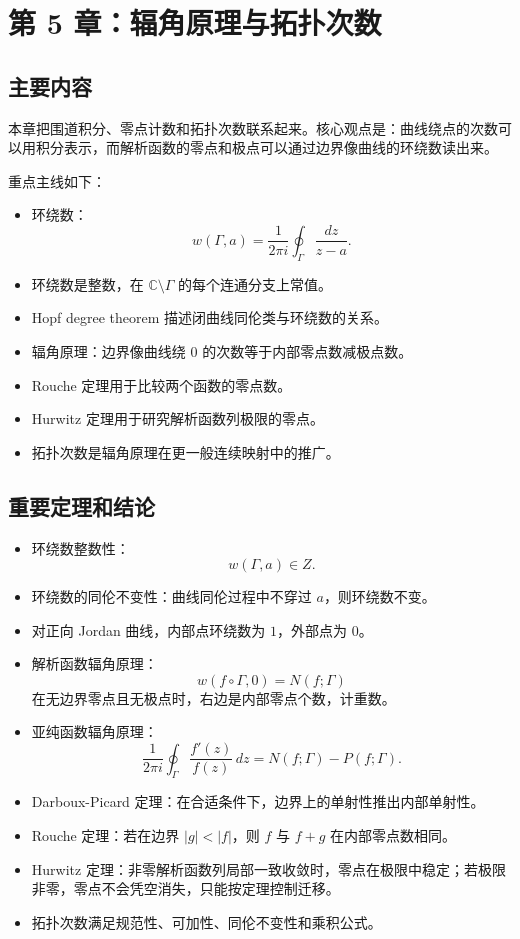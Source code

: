 \documentclass{article}
\begin{document}
\section{第 5 章：辐角原理与拓扑次数}

\subsection{主要内容}

本章把围道积分、零点计数和拓扑次数联系起来。核心观点是：曲线绕点的次数可以用积分表示，而解析函数的零点和极点可以通过边界像曲线的环绕数读出来。

重点主线如下：

\begin{itemize}
\item
  环绕数： \[
  w(\Gamma,a)=\frac{1}{2\pi i}\oint_\Gamma\frac{dz}{z-a}.
  \]
\item
  环绕数是整数，在 \(\mathbb C\setminus\Gamma\)
  的每个连通分支上常值。
\item
  Hopf degree theorem 描述闭曲线同伦类与环绕数的关系。
\item
  辐角原理：边界像曲线绕 $0$ 的次数等于内部零点数减极点数。
\item
  Rouche 定理用于比较两个函数的零点数。
\item
  Hurwitz 定理用于研究解析函数列极限的零点。
\item
  拓扑次数是辐角原理在更一般连续映射中的推广。
\end{itemize}

\subsection{重要定理和结论}

\begin{itemize}
\item
  环绕数整数性： \[
  w(\Gamma,a)\in Z.
  \]
\item
  环绕数的同伦不变性：曲线同伦过程中不穿过 $a$，则环绕数不变。
\item
  对正向 Jordan 曲线，内部点环绕数为 $1$，外部点为 $0$。
\item
  解析函数辐角原理： \[
  w(f\circ \Gamma,0)=N(f;\Gamma)
  \] 在无边界零点且无极点时，右边是内部零点个数，计重数。
\item
  亚纯函数辐角原理： \[
  \frac{1}{2\pi i}\oint_\Gamma \frac{f'(z)}{f(z)}\,dz
  =N(f;\Gamma)-P(f;\Gamma).
  \]
\item
  Darboux-Picard 定理：在合适条件下，边界上的单射性推出内部单射性。
\item
  Rouche 定理：若在边界
  \(|g|<|f|\)，则
  \(f\) 与 \(f+g\) 在内部零点数相同。
\item
  Hurwitz
  定理：非零解析函数列局部一致收敛时，零点在极限中稳定；若极限非零，零点不会凭空消失，只能按定理控制迁移。
\item
  拓扑次数满足规范性、可加性、同伦不变性和乘积公式。
\end{itemize}
\end{document}
